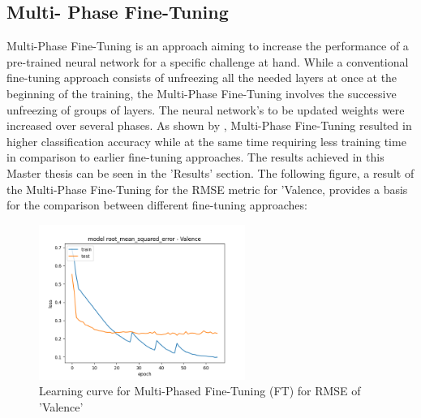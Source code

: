 \subsection{Multi- Phase Fine-Tuning}
Multi-Phase Fine-Tuning is an approach aiming to increase the performance of a pre-trained neural network for a specific challenge at hand. While a conventional fine-tuning approach consists of unfreezing all the needed layers at once at the beginning of the training, the Multi-Phase Fine-Tuning involves the successive unfreezing of groups of layers. The neural network's to be updated weights were increased over several phases. As shown by \citet{Sarhan:2020:MultiPhaseFineTuning}, Multi-Phase Fine-Tuning resulted in higher classification accuracy while at the same time requiring less training time in comparison to earlier fine-tuning approaches.
\newline\newline
The results achieved in this Master thesis can be seen in the 'Results' section. The following figure, a result of the Multi-Phase Fine-Tuning for the RMSE metric for 'Valence, provides a basis for the comparison between different fine-tuning approaches:

\begin{figure}[H]
  \begin{center}
  \includegraphics[angle=0, width=0.6\textwidth]{Figures/rmse_out1.png}
  \caption{Learning curve for Multi-Phased Fine-Tuning (FT) for RMSE of 'Valence'}
  \label{fig:MultiPhaseFT}
  \end{center}
\end{figure}

